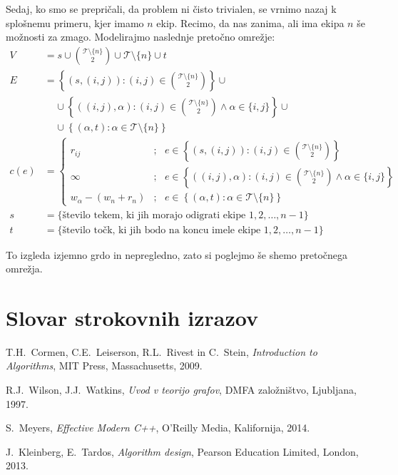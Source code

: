 \documentclass[mat1]{fmfdelo}
\begin{document}
Sedaj, ko smo se prepričali, da problem ni čisto trivialen, se vrnimo nazaj k splošnemu primeru, kjer imamo $n$ ekip. Recimo, da nas zanima, ali ima ekipa $n$ še možnosti za zmago. Modelirajmo naslednje pretočno omrežje:
\begin{align*}
V &= s \cup \binom{\mathcal{T} \setminus \{n\}}{2} \cup \mathcal{T} \setminus \{n\} \cup t\\
E &= \left\{(s,(i,j)) : (i,j) \in \binom{\mathcal{T} \setminus \{n\}}{2}\right\} \cup\\
&~~~~~\cup \left\{((i,j), \alpha) : (i,j) \in \binom{\mathcal{T} \setminus \{n\}}{2} \wedge \alpha \in \{i,j\}\right\} \cup\\
&~~~~~\cup \left\{(\alpha, t) : \alpha \in \mathcal{T} \setminus \{n\}\right\}\\
c(e) &=\begin{cases}
r_{ij} &;~~~ e \in \left\{(s,(i,j)) : (i,j) \in \binom{\mathcal{T} \setminus \{n\}}{2}\right\}\\
\infty &;~~~ e \in \left\{((i,j), \alpha) : (i,j) \in \binom{\mathcal{T} \setminus \{n\}}{2} \wedge \alpha \in \{i,j\}\right\}\\
w_{\alpha} - (w_n + r_n) &;~~~ e \in \left\{(\alpha, t) : \alpha \in \mathcal{T} \setminus \{n\}\right\}
\end{cases}\\
s &= \{\textrm{število tekem, ki jih morajo odigrati ekipe $1,2,\dotsc,n-1$}\}\\
t &= \{\textrm{število točk, ki jih bodo na koncu imele ekipe $1,2,\dotsc, n-1$}\}
\end{align*}

To izgleda izjemno grdo in nepregledno, zato si poglejmo še shemo pretočnega omrežja.
























\newpage


\section*{Slovar strokovnih izrazov}

\geslo{}{}
\geslo{}{}


\begin{thebibliography}{99}

T.H.~Cormen, C.E.~Leiserson, R.L.~Rivest in C.~Stein, \emph{Introduction to Algorithms}, MIT Press, Massachusetts, 2009.

R.J.~Wilson, J.J.~Watkins, \emph{Uvod v teorijo grafov}, DMFA založništvo, Ljubljana, 1997.

S.~Meyers, \emph{Effective Modern C++}, O'Reilly Media, Kalifornija, 2014.

J.~Kleinberg, E.~Tardos, \emph{Algorithm design}, Pearson Education Limited, London, 2013.
\end{thebibliography}
\end{document}
